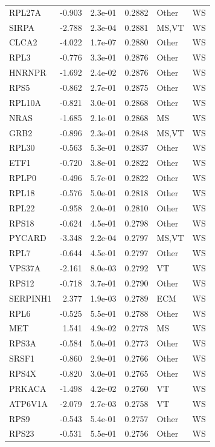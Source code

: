 \begin{table}[ht]
\begin{tabular}{lrlrll}
  RPL27A & -0.903 & 2.3e-01 & 0.2882 & Other & WS \\ 
  SIRPA & -2.788 & 2.3e-04 & 0.2881 & MS,VT & WS \\ 
  CLCA2 & -4.022 & 1.7e-07 & 0.2880 & Other & WS \\ 
  RPL3 & -0.776 & 3.3e-01 & 0.2876 & Other & WS \\ 
  HNRNPR & -1.692 & 2.4e-02 & 0.2876 & Other & WS \\ 
  RPS5 & -0.862 & 2.7e-01 & 0.2875 & Other & WS \\ 
  RPL10A & -0.821 & 3.0e-01 & 0.2868 & Other & WS \\ 
  NRAS & -1.685 & 2.1e-01 & 0.2868 & MS & WS \\ 
  GRB2 & -0.896 & 2.3e-01 & 0.2848 & MS,VT & WS \\ 
  RPL30 & -0.563 & 5.3e-01 & 0.2837 & Other & WS \\ 
  ETF1 & -0.720 & 3.8e-01 & 0.2822 & Other & WS \\ 
  RPLP0 & -0.496 & 5.7e-01 & 0.2822 & Other & WS \\ 
  RPL18 & -0.576 & 5.0e-01 & 0.2818 & Other & WS \\ 
  RPL22 & -0.958 & 2.0e-01 & 0.2810 & Other & WS \\ 
  RPS18 & -0.624 & 4.5e-01 & 0.2798 & Other & WS \\ 
  PYCARD & -3.348 & 2.2e-04 & 0.2797 & MS,VT & WS \\ 
  RPL7 & -0.644 & 4.5e-01 & 0.2797 & Other & WS \\ 
  VPS37A & -2.161 & 8.0e-03 & 0.2792 & VT & WS \\ 
  RPS12 & -0.718 & 3.7e-01 & 0.2790 & Other & WS \\ 
  SERPINH1 & 2.377 & 1.9e-03 & 0.2789 & ECM & WS \\ 
  RPL6 & -0.525 & 5.5e-01 & 0.2788 & Other & WS \\ 
  MET & 1.541 & 4.9e-02 & 0.2778 & MS & WS \\ 
  RPS3A & -0.584 & 5.0e-01 & 0.2773 & Other & WS \\ 
  SRSF1 & -0.860 & 2.9e-01 & 0.2766 & Other & WS \\ 
  RPS4X & -0.820 & 3.0e-01 & 0.2765 & Other & WS \\ 
  PRKACA & -1.498 & 4.2e-02 & 0.2760 & VT & WS \\ 
  ATP6V1A & -2.079 & 2.7e-03 & 0.2758 & VT & WS \\ 
  RPS9 & -0.543 & 5.4e-01 & 0.2757 & Other & WS \\ 
  RPS23 & -0.531 & 5.5e-01 & 0.2756 & Other & WS \\ 

\end{tabular}
\end{table}
